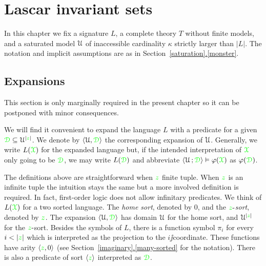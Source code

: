 \documentclass[creche.tex]{subfiles}
\begin{document}
\chapter{Lascar invariant sets}
\label{invariantL}


\def\medrel#1{\parbox[t]{6ex}{$\displaystyle\hfil #1$}}
\def\ceq#1#2#3{\parbox[t]{18ex}{$\displaystyle #1$}\medrel{#2}{$\displaystyle #3$}}

\def\mr{\color{brown}}
\def\gr{\color{green}}



In this chapter we fix a signature $L$, a complete theory $T$ without finite models, and a saturated model $\EuScript U$ of inaccessible cardinality $\kappa$ strictly larger than $|L|$.
The notation and implicit assumptions are as in Section~\hyperref[monster]{\ref*{saturation}.\ref*{monster}}.



\section{Expansions}
\label{expansions}

\def\ceq#1#2#3{\parbox[t]{16ex}{$\displaystyle #1$}\medrel{#2}{$\displaystyle #3$}}

This section is only marginally required in the present chapter so it can be postponed with minor consequences.

We will find it convenient to expand the language $L$ with a predicate for a given $\grD\subseteq\U^{|{\gr z}|}$. We denote by $\<\U,\grD\>$ the corresponding expansion of $\EuScript U$. Generally, we write \emph{$L({\gr\X})$} for the expanded language but, if the intended interpretation of ${\gr\X}$ only going to be $\grD$, we may write \emph{$L(\grD)$} and abbreviate $\<\U\,;\grD\>\models\phi({\gr\X})$ as $\phi(\grD)$. 



\begin{remark}
The definitions above are straightforward when ${\gr z}$ finite tuple. When ${\gr z}$ is an infinite tuple the intuition stays the same but a more involved definition is required. In fact, first-order logic does not allow infinitary predicates. We think of $L({\gr\X})$ for a two sorted language. The \textit{home sort}, denoted by $0$, and the ${\gr z}\jj$\textit{sort}, denoted by ${\gr z}$. The expansion $\<\U,\grD\>$ has domain $\EuScript U$ for the home sort, and $\U^{|{\gr z}|}$ for the ${\gr z}\jj$sort. Besides the symbols of $L$, there is a function symbol $\pi_i$ for every $i<|{\gr z}|$ which is interpreted as the projection to the $i\jj$coordinate. These functions have arity $\<{\gr z},0\>$ (see Section~\hyperref[many-sorted]{\ref*{imaginary}.\ref*{many-sorted}} for the notation). There is also a predicate of sort $\<{\gr z}\>$ interpreted as $\grD$.\QED
\end{remark}
\end{document}
